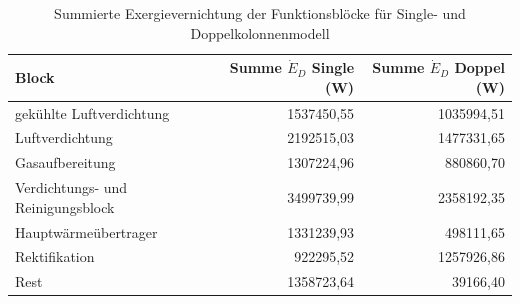 \begin{longtable}{lrr}
\caption{Summierte Exergievernichtung der Funktionsblöcke für Single- und Doppelkolonnenmodell} \\
\hline
Block & Summe $\dot{E}_D$ Single (W) & Summe $\dot{E}_D$ Doppel (W) \\
\hline
gekühlte Luftverdichtung & 1537450,55 & 1035994,51 \\
Luftverdichtung & 2192515,03 & 1477331,65 \\
Gasaufbereitung & 1307224,96 & 880860,70 \\
Verdichtungs- und Reinigungsblock & 3499739,99 & 2358192,35 \\
Hauptwärmeübertrager & 1331239,93 & 498111,65 \\
Rektifikation & 922295,52 & 1257926,86 \\
Rest & 1358723,64 & 39166,40 \\
\hline
\end{longtable}
